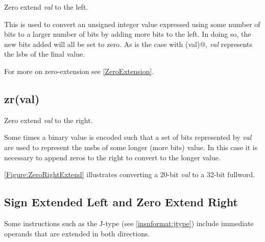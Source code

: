 Zero extend {\em val} to the left.

This is used to convert an unsigned integer value expressed using some number of 
bits to a larger number of bits by adding more bits to the left.  In doing so, 
the new bits added will all be set to zero.  As is the case with \verb@sx(val)@,
{\em val} represents the \acrshort{lsb}s of the final value.  

For more on zero-extension see \autoref{ZeroExtension}.


\subsection{zr(val)}
\label{extension:zr}

Zero extend {\em val} to the right.

Some times a binary value is encoded such that a set of bits represented
by {\em val} are used to represent the \acrshort{msb}s of some longer (more bits) 
value.  
In this case it is necessary to append zeros to the right to convert \verb@val@ to 
the longer value.

\autoref{Figure:ZeroRightExtend} illustrates converting a 20-bit {\em val} to
a 32-bit fullword.

\begin{figure}[ht]
\centering
{}
\label{Figure:ZeroRightExtend}
\end{figure}



\subsection{Sign Extended Left and Zero Extend Right}
\label{extension:slzr}

Some instructions such as the J-type (see \autoref{insnformat:jtype}) include
immediate operands that are extended in both directions.

